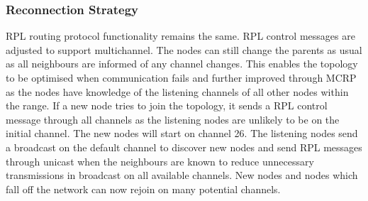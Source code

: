 \subsubsection{Reconnection Strategy}
RPL routing protocol functionality remains the same. RPL control messages are adjusted to support multichannel.
The nodes can still change the parents as usual as all neighbours are informed of any channel changes.
This enables the topology to be optimised when communication fails and further improved through MCRP as the nodes have knowledge of the listening channels of all other nodes within the range. If a new node tries to join the topology, it sends a RPL control message through all channels as the listening nodes are unlikely to be on the initial channel. The new nodes will start on channel 26.
The listening nodes send a broadcast on the default channel to discover new nodes and send RPL messages through unicast when the neighbours are known to reduce unnecessary transmissions in broadcast on all available channels. New nodes and nodes which fall off the network can now rejoin on many potential channels.

